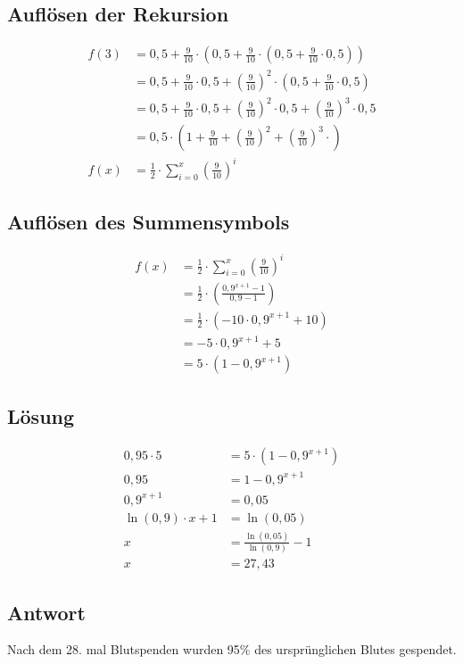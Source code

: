 \documentclass[a4paper,9pt]{scrartcl}
\begin{document}
    \subsection{Auflösen der Rekursion}
        \begin{align}
             f(3) &= 0{,}5 + \frac{9}{10} \cdot (0{,}5 + \frac{9}{10} \cdot (0{,}5 + \frac{9}{10} \cdot 0{,}5))\\
                  &= 0{,}5 + \frac{9}{10} \cdot 0{,}5 + (\frac{9}{10})^2 \cdot (0{,}5 + \frac{9}{10} \cdot 0{,}5)\\
                  &= 0{,}5 + \frac{9}{10} \cdot 0{,}5 + (\frac{9}{10})^2 \cdot 0{,}5 + (\frac{9}{10})^3 \cdot 0{,}5\\
                  &= 0{,}5 \cdot (1 + \frac{9}{10} + (\frac{9}{10})^2 + (\frac{9}{10})^3 \cdot )\\
              f(x)&= \frac{1}{2} \cdot \sum_{i=0}^{x} (\frac{9}{10})^i
        \end{align}

    \subsection{Auflösen des Summensymbols}
        \begin{align}
            f(x) &= \frac{1}{2} \cdot \sum_{i=0}^{x} (\frac{9}{10})^i\\
                 &= \frac{1}{2}\cdot (\frac{0{,}9^{x+1} - 1}{0{,}9 - 1})\\
                 &= \frac{1}{2}\cdot (-10 \cdot 0{,}9^{x+1} + 10)\\
                 &= -5 \cdot 0{,}9^{x+1} + 5\\
                 &= 5 \cdot (1 - 0{,}9^{x+1})
        \end{align}

    \subsection{Lösung}
        \begin{align}
            0{,}95 \cdot 5 &= 5 \cdot (1- 0{,}9^{x+1})\\
                    0{,}95 &= 1 - 0{,}9^{x+1}\\
              0{,}9^{x+1} &= 0{,}05\\
    \ln(0{,}9) \cdot {x+1} &= \ln(0{,}05) \\
                     x  &= \frac{\ln(0{,}05)}{\ln(0{,}9)} - 1\\
                     x  &= 27{,}43
        \end{align}
    \subsection{Antwort}
        Nach dem 28. mal Blutspenden wurden 95\% des ursprünglichen Blutes 
        gespendet.
\end{document}

